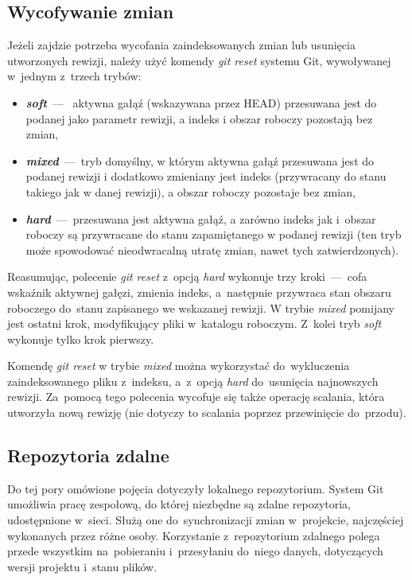 \documentclass[12pt,a4paper,polish,thesis]{dcsbook}
\begin{document}
	\subsection{Wycofywanie zmian}
	Jeżeli zajdzie potrzeba wycofania zaindeksowanych zmian lub usunięcia utworzonych rewizji, należy użyć komendy \textit{git reset} systemu Git, wywoływanej w~jednym z~trzech trybów:
	\begin{itemize}
		\item \textbf{\textit{soft}}~---~ aktywna gałąź (wskazywana przez HEAD) przesuwana jest do podanej jako parametr rewizji, a indeks i obszar roboczy pozostają bez zmian,
		\item \textbf{\textit{mixed}}~---~tryb domyślny, w którym aktywna gałąź przesuwana jest do podanej rewizji i dodatkowo zmieniany jest indeks (przywracany do stanu takiego jak w danej rewizji), a obszar roboczy pozostaje bez zmian,
		\item \textbf{\textit{hard}}~---~przesuwana jest aktywna gałąź, a zarówno indeks jak i~obszar roboczy są przywracane do stanu zapamiętanego w podanej rewizji (ten tryb może spowodować nieodwracalną utratę zmian, nawet tych zatwierdzonych).
	\end{itemize}
	Reasumując, polecenie \textit{git reset} z~opcją \textit{hard} wykonuje trzy kroki~---~cofa wskaźnik aktywnej gałęzi, zmienia indeks, a~następnie przywraca stan obszaru roboczego do~stanu zapisanego we wskazanej rewizji. W trybie \textit{mixed} pomijany jest ostatni krok, modyfikujący pliki w~katalogu roboczym. Z~kolei tryb \textit{soft} wykonuje tylko krok pierwszy.

	Komendę \textit{git reset} w trybie \textit{mixed} można wykorzystać do~wykluczenia zaindeksowanego pliku z~indeksu, a~z~opcją \textit{hard} do~usunięcia najnowszych rewizji. Za~pomocą tego polecenia wycofuje się także operację scalania, która utworzyła nową rewizję (nie dotyczy to scalania poprzez przewinięcie do~przodu).

	\subsection{Repozytoria zdalne}
	Do tej pory omówione pojęcia dotyczyły lokalnego repozytorium. System Git umożliwia pracę zespołową, do której niezbędne są zdalne repozytoria, udostępnione w~sieci. Służą one do~synchronizacji zmian w~projekcie, najczęściej wykonanych przez różne osoby. Korzystanie z~repozytorium zdalnego polega przede wszystkim na~pobieraniu i~przesyłaniu do~niego danych, dotyczących wersji projektu i~stanu plików.
\end{document}
